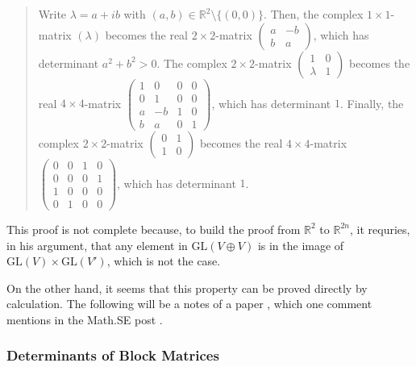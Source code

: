 \documentclass{article}
\numberwithin{equation}{subsection} %
\theoremstyle{definition}
\begin{document}
\begin{quote}
        Write $\lambda=a+ib$ with $(a,b) \in \mathbb{R}^2 \setminus \{(0,0)\}$. Then, the complex $1 \times 1$-matrix $(\lambda)$ becomes the real $2 \times 2$-matrix $\begin{pmatrix} a & -b \\ b & a \end{pmatrix}$, which has determinant $a^2+b^2 > 0$. The complex $2 \times 2$-matrix $\begin{pmatrix} 1 & 0 \\ \lambda & 1 \end{pmatrix}$ becomes the real $4 \times 4$-matrix
        $\begin{pmatrix}
        1 & 0 & 0 & 0 \\
        0 & 1 & 0 & 0 \\
        a & -b & 1 & 0 \\
        b & a & 0 & 1 \end{pmatrix}$, 
        which has determinant $1$. Finally, the complex $2 \times 2$-matrix  $\begin{pmatrix} 0 & 1 \\ 1 & 0 \end{pmatrix}$ becomes the real $4 \times 4$-matrix $\begin{pmatrix} 0 & 0 & 1 & 0 \\ 0 & 0 & 0 & 1\\ 1 & 0 & 0 & 0 \\ 0 & 1 & 0 & 0 \end{pmatrix}$, which has determinant $1$.

    \end{quote}

    This proof is not complete because, to build the proof from 
    $\mathbb{R}^2$ to $\mathbb{R}^{2n}$, it requries, in his argument, that
    any element in $\mathrm{GL}(V\oplus V)$ is in the image of
    $\mathrm{GL}(V)\times \mathrm{GL}(V')$, which is not the case.

    On the other hand, it seems that this property can be proved directly
    by calculation. The following will be a notes of a paper 
    \cite{determinants_of_block_m}, which one comment mentions 
    in the Math.SE post \cite{math.se_2}.

        \subsubsection{Determinants of Block Matrices}
        \label{sec:Determinants of Block Matrices}
        
\end{document}
